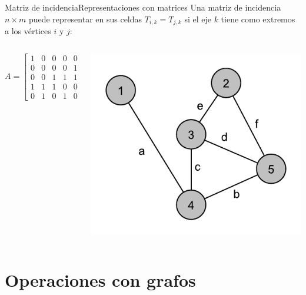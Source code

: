 \documentclass[spanish, c]{beamer}
\begin{document}
\begin{frame}{Matriz de incidencia}{Representaciones con matrices}
    Una matriz de \alert{incidencia} $n \times m$ puede representar en sus celdas $T_{i,k} = T_{j,k}$ si el eje $k$ tiene como extremos a los vértices $i$ y $j$:

    \begin{columns}
        \begin{column}{0.5\textwidth}
            $$A = \begin{bmatrix}%
                1 & 0 & 0 & 0 & 0 & 0 \\
                0 & 0 & 0 & 0 & 1 & 1 \\
                0 & 0 & 1 & 1 & 1 & 0 \\
                1 & 1 & 1 & 0 & 0 & 0 \\
                0 & 1 & 0 & 1 & 0 & 1
            \end{bmatrix}$$
        \end{column}
        \begin{column}{0.5\textwidth}
            \includegraphics[width=\textwidth]{adj-inc.pdf}
        \end{column}
    \end{columns}
\end{frame}

\section{Operaciones con grafos}
\end{document}
